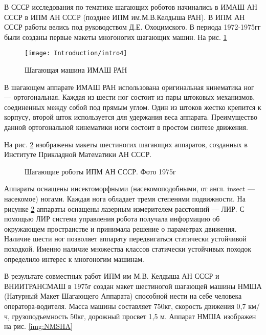 В СССР исследования по тематике шагающих роботов начинались в ИМАШ АН СССР в ИПМ АН СССР (позднее ИПМ им.М.В.Келдыша РАН). В ИПМ АН СССР работы велись под руководством Д.Е. Охоцимского. В периода 1972-1975гг были созданы первые макеты многоногих шагающих машин. На рис. \ref{img:imash_ran}

\begin{figure}[ht]
	\centering
	\texttt{[image: Introduction/intro4]}
	\caption{Шагающая машина ИМАШ РАН}
	\label{img:imash_ran}
\end{figure}

В шагающем аппарате ИМАШ РАН использована оригинальная кинематика ног --- ортогональная. Каждая из шести ног состоит из пары штоковых механизмов, соединенных между собой под прямым углом. Один из штоков жестко крепится к корпусу, второй шток используется для удержания веса аппарата. Преимущество данной ортогональной кинематики ноги состоит в простом синтезе движения.

На рис. \ref{img:IPM_robots} изображены макеты шестиногих шагающих аппаратов, созданных в Институте Прикладной Математики АН СССР.

\begin{figure}[ht]
	\begin{minipage}[ht]{0.49\linewidth}
	\end{minipage}
	\hfill
	\begin{minipage}[ht]{0.49\linewidth}
	\end{minipage}
	\caption{Шагающие роботы ИПМ АН СССР. Фото 1975г}
	\label{img:IPM_robots}  
\end{figure}

Аппараты оснащены инсектоморфными (насекомоподобными, от англ. insect --- насекомое) ногами. Каждая нога обладает тремя степенями подвижности. На рисунке \ref{img:IPM_robots} аппараты оснащены лазерным измерителем расстояний --- ЛИР. С помощью ЛИР система управления робота получала информацию об окружающем пространстве и принимала решение о параметрах движения. Наличие шести ног позволяет аппарату передвигаться статически устойчивой походкой. Именно наличие множества классов статически устойчивых походок определило интерес к многоногим машинам.

В результате совместных работ ИПМ им М.В. Келдыша АН СССР и ВНИИТРАНСМАШ в 1975г создан макет шестиногой шагающей машины НМША (Натурный Макет Шагающего Аппарата) способной нести на себе человека оператора-водителя. Масса машины составляет 750кг, скорость движения 0,7 км/ч, грузоподъемность 50кг, дорожный просвет 1,5 м. Аппарат НМША изображен на рис. \ref{img:NMSHA}


